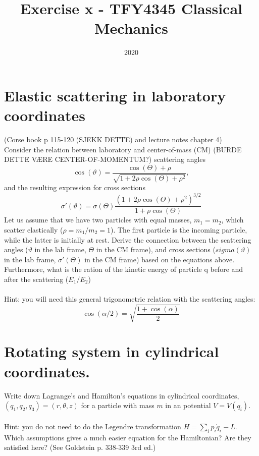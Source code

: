 \documentclass{article}
\title{Exercise x - TFY4345 Classical Mechanics}
\date{2020}
\begin{document}
    \maketitle

    \section{Elastic scattering in laboratory coordinates}
    (Corse book p 115-120 (SJEKK DETTE) and lecture notes chapter 4)\\
    Consider the relation between laboratory and center-of-mass (CM) (BURDE DETTE VÆRE CENTER-OF-MOMENTUM?) scattering angles
    \begin{equation}
        \cos(\vartheta) = \frac{\cos(\Theta) + \rho}{\sqrt{1 + 2\rho \cos(\Theta) + \rho^2}},
    \end{equation}
    and the resulting expression for cross sections 
    \begin{equation}
        \sigma'(\vartheta) = \sigma (\Theta) \frac{(1 + 2\rho \cos(\Theta) + \rho^2)^{3/2}}{1 + \rho \cos(\Theta)}
    \end{equation}
    Let us assume that we have two particles with equal masses, $m_1 = m_2$, which scatter elastically ($\rho = m_1/m_2 = 1$). The first particle is the incoming particle, while the latter is initially at rest. Derive the connection between the scattering angles ($\vartheta$ in the lab frame, $\Theta$ in the CM frame), and cross sections ($sigma(\vartheta)$ in the lab frame, $\sigma'(\Theta)$ in the CM frame) based on the equations above. Furthermore, what is the ration of the kinetic energy of particle q before and after the scattering ($E_1 / E_2$)
    \\
    \\
    Hint: you will need this general trigonometric relation with the scattering angles:
    \begin{equation}
        \cos(\alpha/2) = \sqrt{\frac{1 + \cos(\alpha)}{2}}
    \end{equation}

    \section{Rotating system in cylindrical coordinates.}
    Write down Lagrange's and Hamilton's equations in cylindrical coordinates, $(q_1, q_2, q_3) = (r, \theta, z)$ for a particle with mass $m$ in an potential $V = V(q_    i)$.
    \\
    \\
    Hint: you do not need to do the Legendre transformation $H = \sum_i p_i \dot q_i - L$. Which assumptions gives a much easier equation for the Hamiltonian? Are they satisfied here? (See Goldstein p. 338-339 3rd ed.)
\end{document}
